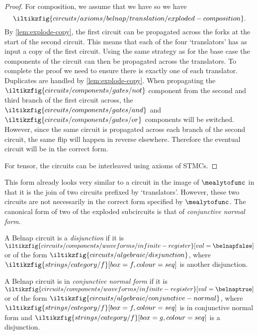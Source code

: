 \begin{proof}
    For composition, we assume that we have
    so we have \[
        \iltikzfig{circuits/axioms/belnap/translation/exploded-composition}.
    \]
    By \cref{lem:explode-copy}, the first circuit can be propagated across
    the forks at the start of the second circuit.
    This means that each of the four `translators' has as input a copy of the
    first circuit.
    Using the same strategy as for the base case the components of the circuit
    can then be propagated across the translators.
    To complete the proof we need to ensure there is exactly one of each
    translator.
    Duplicates are handled by \cref{lem:explode-copy}.
    When propagating the \(
    \iltikzfig{circuits/components/gates/not}
    \) component from the second and third branch of the first circuit across,
    the \(
    \iltikzfig{circuits/components/gates/and}
    \) and \(
    \iltikzfig{circuits/components/gates/or}
    \) components will be switched.
    However, since the same circuit is propagated across each branch of the
    second circuit, the same
    flip will happen in reverse elsewhere.
    Therefore the eventual circuit will be in the correct form.

    For tensor, the circuits can be interleaved using axioms of STMCs.
\end{proof}

This form already looks very similar to a circuit in the image of
\(\mealytofunc\) in that it is the join of two circuits prefixed by
`translators'.
However, these two circuits are not necessarily in the correct form specified by
\(\mealytofunc\).
The canonical form of two of the exploded subcircuits is that of
\emph{conjunctive normal form}.

\begin{definition}[Disjunction]
    A Belnap circuit is a \emph{disjunction} if it is \(
    \iltikzfig{circuits/components/waveforms/infinite-register}[val=\belnapfalse]
    \) or of the form \(
    \iltikzfig{circuits/algebraic/disjunction}
    \), where \(
    \iltikzfig{strings/category/f}[box=f, colour=seq]
    \) is another disjunction.
\end{definition}

\begin{definition}
    A Belnap circuit is in \emph{conjunctive normal form} if it is \(
    \iltikzfig{circuits/components/waveforms/infinite-register}[val=\belnaptrue]
    \) or of the form \(
    \iltikzfig{circuits/algebraic/conjunctive-normal}
    \), where \(
    \iltikzfig{strings/category/f}[box=f, colour=seq]
    \) is in conjunctive normal form and \(
    \iltikzfig{strings/category/f}[box=g, colour=seq]
    \) is a disjunction.
\end{definition}


